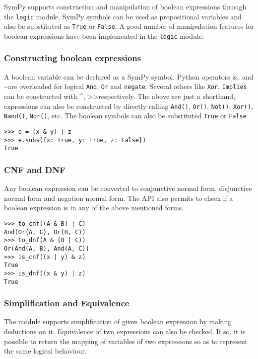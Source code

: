 
SymPy supports construction and manipulation of boolean expressions
through the \texttt{logic} module. SymPy symbols can be used as 
propositional variables and also be substituted as \texttt{True} 
or \texttt{False}. A good number of manipulation features for boolean 
expressions have been implemented in the \texttt{logic} module.

\subsubsection{Constructing boolean expressions}

A boolean variable can be declared as a SymPy symbol. Python
operators \&, \textbar  and \textasciitilde are overloaded for logical \texttt{And}, 
\texttt{Or} and \texttt{negate}. Several others like \texttt{Xor},
\texttt{Implies} can be constructed with \^{}, \textgreater\textgreater respectively.  
The above are just a shorthand, expressions can also be constructed
by directly calling \texttt{And()}, \texttt{Or()}, \texttt{Not()},
\texttt{Xor()}, \texttt{Nand()}, \texttt{Nor()}, etc.
The boolean symbols can also be substituted \texttt{True} or \texttt{False}

\begin{verbatim}
>>> e = (x & y) | z
>>> e.subs({x: True, y: True, z: False})
True
\end{verbatim}

\subsubsection{CNF and DNF}

Any boolean expression can be converted to conjunctive normal 
form, disjunctive normal form and negation normal form. The 
API also permits to check if a boolean expression is in any 
of the above mentioned forms.

\begin{verbatim}
>>> to_cnf((A & B) | C)
And(Or(A, C), Or(B, C))
>>> to_dnf(A & (B | C))
Or(And(A, B), And(A, C))
>>> is_cnf((x | y) & z)
True
>>> is_dnf((x & y) | z) 
True
\end{verbatim}

\subsubsection{Simplification and Equivalence}

The module supports simplification of given boolean expression
by making deductions on it. Equivalence of two expressions can
also be checked. If so, it is possible to return the mapping of 
variables of two expressions so as to represent the 
same logical behaviour.

